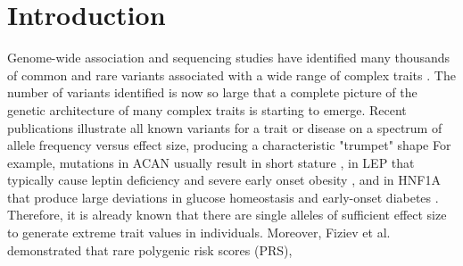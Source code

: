 \documentclass[12pt]{zHenriquesLab-StyleBioRxiv}
\begin{document}
\section*{Introduction}  \label{sec:intro}  
Genome-wide association and sequencing studies have identified many thousands of common and rare variants associated with a 
wide range of complex traits \cite{Abdellaoui2023,Flannick2019,Singh2022}. The number of variants 
identified is now so large that a complete picture of the genetic architecture of 
many complex traits is starting to emerge. Recent publications illustrate all known 
variants for a trait or disease on a spectrum of allele frequency versus effect size, producing a 
characteristic "trumpet" shape \cite{Yengo2022,Corte2023}{\color{red}{, in which identified rarer variants have exponentially larger effects. These effects are sometimes so large relative to those of common alleles that they cause extreme trait values on most genetic backgrounds.}} For example, mutations in ACAN usually result in short stature \cite{vanDerSteen2017}, in LEP that typically cause leptin 
deficiency and severe early onset obesity \cite{Saeed2015}, and in HNF1A 
that produce large deviations in glucose homeostasis and early-onset diabetes \cite{Miyachi2022}. 
Therefore, it is already known that there are single alleles of sufficient effect size 
to generate extreme trait values in individuals. Moreover, Fiziev et al. \cite{Fiziev2023} 
demonstrated that rare polygenic risk scores (PRS), {\color{red}{based on an aggregate of rare allele effects inferred using their PrimateAI-3D algorithm, were particularly predictive for individuals with extreme trait values. Rare alleles with dramatic effects on complex disease have also been identified, such as in LPA on cardiovascular disease, in the APP and PSEN genes that cause Alzheimer’s disease, and cumulative loss-of-function mutations associated with more severe forms of schizophrenia and autism.}}
\end{document}
